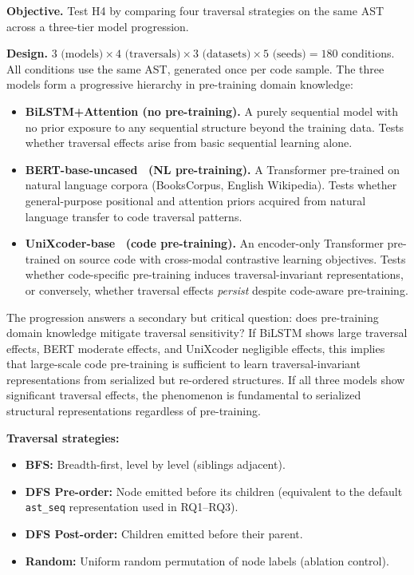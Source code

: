 \documentclass[pdflatex,sn-mathphys,Numbered]{sn-jnl}
\begin{document}
\textbf{Objective.} Test H4 by comparing four traversal strategies on the same AST across a three-tier model progression.

\textbf{Design.} $3 \text{ (models)} \times 4 \text{ (traversals)} \times 3 \text{ (datasets)} \times 5 \text{ (seeds)} = 180$ conditions. All conditions use the same AST, generated once per code sample. The three models form a progressive hierarchy in pre-training domain knowledge:

\begin{itemize}
\item \textbf{BiLSTM+Attention (no pre-training).} A purely sequential model with no prior exposure to any sequential structure beyond the training data. Tests whether traversal effects arise from basic sequential learning alone.
\item \textbf{BERT-base-uncased~\citep{devlin2019bert} (NL pre-training).} A Transformer pre-trained on natural language corpora (BooksCorpus, English Wikipedia). Tests whether general-purpose positional and attention priors acquired from natural language transfer to code traversal patterns.
\item \textbf{UniXcoder-base~\citep{guo2022unixcoder} (code pre-training).} An encoder-only Transformer pre-trained on source code with cross-modal contrastive learning objectives. Tests whether code-specific pre-training induces traversal-invariant representations, or conversely, whether traversal effects \emph{persist} despite code-aware pre-training.
\end{itemize}

The progression answers a secondary but critical question: does pre-training domain knowledge mitigate traversal sensitivity? If BiLSTM shows large traversal effects, BERT moderate effects, and UniXcoder negligible effects, this implies that large-scale code pre-training is sufficient to learn traversal-invariant representations from serialized but re-ordered structures. If all three models show significant traversal effects, the phenomenon is fundamental to serialized structural representations regardless of pre-training.

\textbf{Traversal strategies:}
\begin{itemize}
\item \textbf{BFS:} Breadth-first, level by level (siblings adjacent).
\item \textbf{DFS Pre-order:} Node emitted before its children (equivalent to the default \texttt{ast\_seq} representation used in RQ1--RQ3).
\item \textbf{DFS Post-order:} Children emitted before their parent.
\item \textbf{Random:} Uniform random permutation of node labels (ablation control).
\end{itemize}
\end{document}
